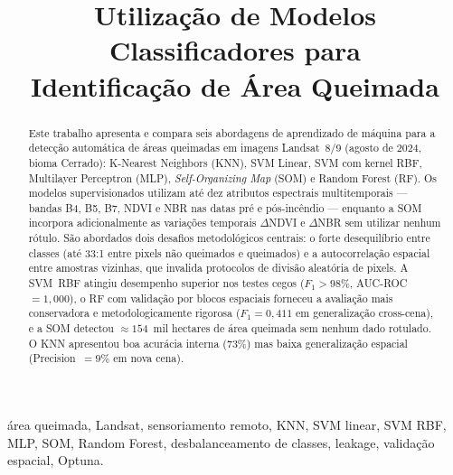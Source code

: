 \documentclass[conference]{IEEEtran}
\begin{document}
\title{Utilização de Modelos Classificadores para\\
Identificação de Área Queimada}

\author{
}

\maketitle

\begin{abstract}
Este trabalho apresenta e compara seis abordagens de aprendizado de
máquina para a detecção automática de áreas queimadas em imagens
Landsat~8/9 (agosto de 2024, bioma Cerrado): K-Nearest Neighbors (KNN),
SVM Linear, SVM com kernel RBF, Multilayer Perceptron (MLP),
\textit{Self-Organizing Map} (SOM) e Random Forest (RF). Os modelos
supervisionados utilizam até dez atributos espectrais multitemporais —
bandas B4, B5, B7, NDVI e NBR nas datas pré e pós-incêndio — enquanto
a SOM incorpora adicionalmente as variações temporais $\Delta$NDVI e
$\Delta$NBR sem utilizar nenhum rótulo.
São abordados dois desafios metodológicos centrais: o forte desequilíbrio
entre classes (até 33:1 entre pixels não queimados e queimados) e a
autocorrelação espacial entre amostras vizinhas, que invalida protocolos
de divisão aleatória de pixels. A SVM~RBF atingiu desempenho superior
nos testes cegos ($F_1 > 98\%$, AUC-ROC~$= 1{,}000$), o RF com validação
por blocos espaciais forneceu a avaliação mais conservadora e
metodologicamente rigorosa ($F_1 = 0{,}411$ em generalização cross-cena),
e a SOM detectou $\approx154$~mil hectares de área queimada sem nenhum
dado rotulado. O KNN apresentou boa acurácia interna (73\%) mas baixa
generalização espacial (Precision~$= 9\%$ em nova cena).
\end{abstract}

\begin{IEEEkeywords}
área queimada, Landsat, sensoriamento remoto, KNN, SVM linear, SVM RBF,
MLP, SOM, Random Forest, desbalanceamento de classes, leakage,
validação espacial, Optuna.
\end{IEEEkeywords}
\end{document}
